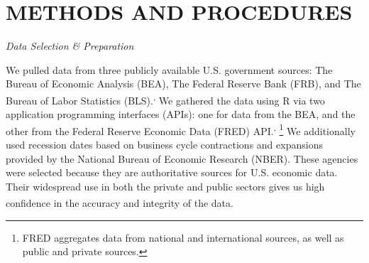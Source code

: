 \documentclass[
  10pt,
  letterpaper,
  DIV=11,
  numbers=noendperiod]{scrartcl}
\begin{document}
\section{METHODS AND PROCEDURES}\label{methods-and-procedures}

\emph{Data Selection \& Preparation}

We pulled data from three publicly available U.S. government sources:
The Bureau of Economic Analysis (BEA), The Federal Reserve Bank (FRB),
and The Bureau of Labor Statistics
(BLS).\textsuperscript{,
} We gathered the data using R via
two application programming interfaces (APIs): one for data from the
BEA, and the other from the Federal Reserve Economic Data (FRED)
API.\textsuperscript{,
}\footnote{FRED aggregates data from national and international sources, as well as public and private sources.}
We additionally used recession dates based on business cycle
contractions and expansions provided by the National Bureau of Economic
Research (NBER). These agencies were selected because they are
authoritative sources for U.S. economic data. Their widespread use in
both the private and public sectors gives us high confidence in the
accuracy and integrity of the
data.\textsuperscript{}
\end{document}

